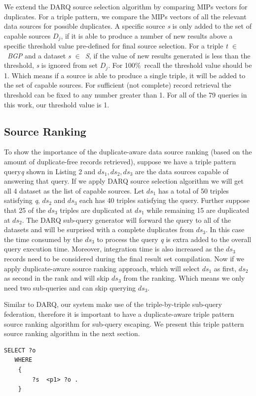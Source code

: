 \documentclass{sig-alternate}  %
\begin{document}
We extend the DARQ source selection algorithm by comparing MIPs vectors
 for duplicates. For a triple pattern, we compare the MIPs
vectors of all the relevant data sources for possible duplicates.
A specific source \emph{s} is only added to the set of capable sources $D_j$,
if it is able to produce a number of new results above a specific threshold value
pre-defined for final source selection. For a triple \emph{t $\in$\ BGP} and a dataset \emph{s $\in$\ S}, if the value of new results generated
is less than the threshold, \emph{s} is ignored from set $D_j$. For 100\%\ recall the threshold value should be 1. Which means if a source is able to produce a single triple, it will be added to the set of capable sources. For sufficient (not complete) record retrieval the threshold can be fixed to any number greater than 1. For all of the 79 queries in this work, our threshold value is 1. 

\subsection{Source Ranking} 
To show the importance of the duplicate-aware data source ranking (based on the amount of duplicate-free records retrieved), suppose we have a triple pattern query\emph{q} shown in Listing 2  and \emph{$ ds_1, ds_2, ds_3 $} are the data sources capable of answering that query. If we apply DARQ source selection algorithm we will get all 4 dataset as the list of capable sources. Let $ds_1$ has a total of 50 triples satisfying \emph{q}, $ds_2$ and $ds_3$ each has 40 triples satisfying the query. Further suppose that 25 of the $ds_3$ triples are duplicated at $ds_1$ while remaining 15 are duplicated at $ds_2$. The DARQ sub-query generator will forward the query to all of the datasets and will be surprised with a complete duplicates from $ds_3$. In this case the time consumed by the $ds_3$ to process the query \emph{q} is extra added to the overall query execution time. Moreover, integration time is also increased as the $ds_3$ records need to be considered during the final result set compilation. Now if we apply duplicate-aware source ranking approach, which will select $ds_1$ as first, $ds_2$ as second in the rank and will skip $ds_3$ from the ranking. Which means we only need two sub-queries and can skip querying $ds_3$. 

Similar to DARQ, our system make use of the triple-by-triple sub-query federation, therefore it is important to have a duplicate-aware triple pattern source ranking algorithm for sub-query escaping. We present this triple pattern source ranking algorithm in the next section. 
\begin{lstlisting}[caption = {A single triple pattern query},basicstyle={\tiny},frame = {single},stringstyle={\ttfamily}]
 SELECT ?o
   WHERE
    {
        ?s  <p1> ?o .
    }
\end{lstlisting}
\end{document}

